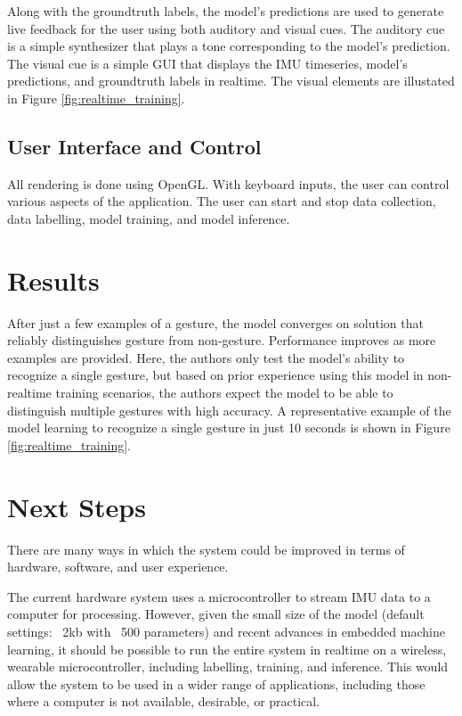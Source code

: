 \documentclass{nime-alternate} %
\begin{document}
Along with the groundtruth labels, the model's predictions are used to generate live feedback for the user using both auditory and visual cues. The auditory cue is a simple synthesizer that plays a tone corresponding to the model's prediction. The visual cue is a simple GUI that displays the IMU timeseries, model's predictions, and groundtruth labels in realtime. The visual elements are illustated in Figure \ref{fig:realtime_training}.

\subsection{User Interface and Control}
All rendering is done using OpenGL. With keyboard inputs, the user can control various aspects of the application. The user can start and stop data collection, data labelling, model training, and model inference.

\section{Results}
After just a few examples of a gesture, the model converges on solution that reliably distinguishes gesture from non-gesture. Performance improves as more examples are provided. Here, the authors only test the model's ability to recognize a single gesture, but based on prior experience using this model in non-realtime training scenarios, the authors expect the model to be able to distinguish multiple gestures with high accuracy. A representative example of the model learning to recognize a single gesture in just 10 seconds is shown in Figure \ref{fig:realtime_training}.

\section{Next Steps}
There are many ways in which the system could be improved in terms of hardware, software, and user experience.

The current hardware system uses a microcontroller to stream IMU data to a computer for processing. However, given the small size of the model (default settings: ~2kb with ~500 parameters) and recent advances in embedded machine learning, it should be possible to run the entire system in realtime on a wireless, wearable microcontroller, including labelling, training, and inference. This would allow the system to be used in a wider range of applications, including those where a computer is not available, desirable, or practical. 
\end{document}
